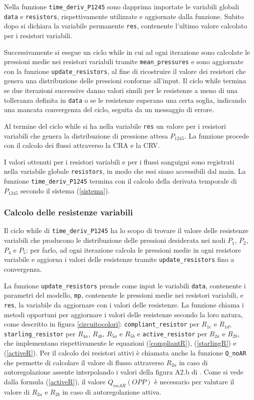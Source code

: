 \documentclass{article}
\begin{document}
Nella funzione \texttt{time\_deriv\_P1245} sono dapprima importate le variabili globali \texttt{data} e \texttt{resistors}, rispettivamente utilizzate e aggiornate dalla funzione.
Subito dopo si dichiara la variabile permanente \texttt{res}, contenente l'ultimo valore calcolato per i resistori variabili.

Successivamente si esegue un ciclo while in cui ad ogni iterazione sono calcolate le pressioni medie nei resistori variabili tramite \texttt{mean\_pressures} e sono aggiornate con la funzione \texttt{update\_resistors}, al fine di ricostruire il valore dei resistori che genera una distribuzione delle pressioni conforme all'input.
Il ciclo while termina se due iterazioni successive danno valori simili per le resistenze a meno di una tolleranza definita in \texttt{data} o se le resistenze superano una certa soglia, indicando una mancata convergenza del ciclo, seguita da un messaggio di errore.

Al termine del ciclo while si ha nella variabile \texttt{res} un valore per i resistori variabili che genera la distribuzione di pressione attesa $P_{1245}$.
La funzione procede con il calcolo dei flussi attraverso la CRA e la CRV.

I valori ottenuti per i resistori variabili e per i flussi sanguigni sono registrati nella variabile globale \texttt{resistors}, in modo che essi siano accessibili dal main.
La funzione \texttt{time\_deriv\_P1245} termina con il calcolo della derivata temporale di $P_{1245}$ secondo il sistema (\ref{sistema}).

\subsubsection*{Calcolo delle resistenze variabili}
Il ciclo while di \texttt{time\_deriv\_P1245} ha lo scopo di trovare il valore delle resistenze variabili che producono le distribuzione delle pressioni desiderata nei nodi $P_1$, $P_2$, $P_4$ e $P_5$: per farlo, ad ogni iterazione calcola le pressioni medie in ogni resistore variabile e aggiorna i valori delle resistenze tramite \texttt{update\_resistors} fino a convergenza.

La funzione \texttt{update\_resistors} prende come input le variabili \texttt{data}, contenente i parametri del modello, \texttt{mp}, contenente le pressioni medie nei resistori variabili, e \texttt{res}, la variabile da aggiornare con i valori delle resistenze.
La funzione chiama i metodi opportuni per aggiornare i valori delle resistenze secondo la loro natura, come descritto in figura \ref{circuitocolori}: \texttt{compliant\_resistor} per $R_{1c}$ e $R_{1d}$, \texttt{starling\_resistor} per $R_{4a}$, $R_{4b}$, $R_{5a}$ e $R_{5b}$ e \texttt{active\_resistor} per $R_{2a}$ e $R_{2b}$, che implementano rispettivamente le equazioni (\ref{compliantR}), (\ref{starlingR}) e (\ref{activeR}).
Per il calcolo dei resistori attivi è chiamata anche la funzione \texttt{Q\_noAR} che permette di calcolare il valore di flusso attraverso $R_{2a}$ in caso di autoregolazione assente interpolando i valori della figura A2.b di \citep{art1}.
Come si vede dalla formula (\ref{activeR}), il valore $Q_{noAR}(OPP)$ è necessario per valutare il valore di $R_{2a}$ e $R_{2b}$ in caso di autoregolazione attiva.
\end{document}
